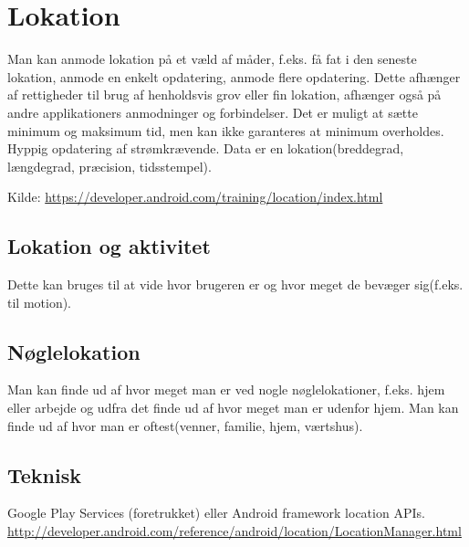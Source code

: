 \section{Lokation}
Man kan anmode lokation på et væld af måder, f.eks. få fat i den seneste lokation, anmode en enkelt opdatering, anmode flere opdatering. 
Dette afhænger af rettigheder til brug af henholdsvis grov eller fin lokation, afhænger også på andre applikationers anmodninger og forbindelser. Det er muligt at sætte minimum og maksimum tid, men kan ikke garanteres at minimum overholdes. Hyppig opdatering af strømkrævende. 
Data er en lokation(breddegrad, længdegrad, præcision, tidsstempel).

Kilde: \url{https://developer.android.com/training/location/index.html}

\subsection{Lokation og aktivitet}
Dette kan bruges til at vide hvor brugeren er og hvor meget de bevæger sig(f.eks. til motion).

\subsection{Nøglelokation}
Man kan finde ud af hvor meget man er ved nogle nøglelokationer, f.eks. hjem eller arbejde og udfra det finde ud af hvor meget man er udenfor hjem. Man kan finde ud af hvor man er oftest(venner, familie, hjem, værtshus).

\subsection{Teknisk}
Google Play Services (foretrukket) eller Android framework location APIs.
\url{http://developer.android.com/reference/android/location/LocationManager.html}
